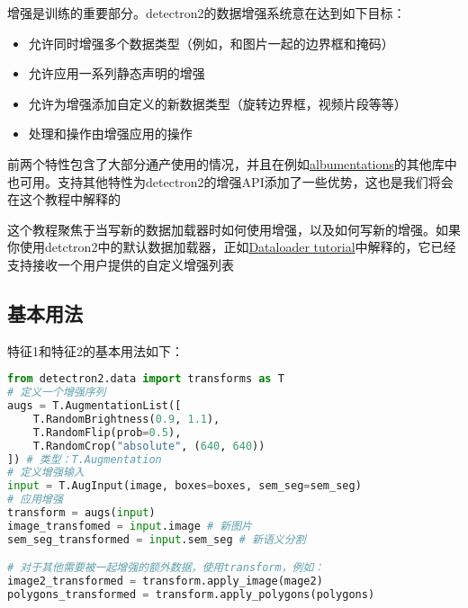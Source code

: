 \documentclass[../main]{subfile}
\begin{document}
增强是训练的重要部分。detectron2的数据增强系统意在达到如下目标：
\begin{itemize}
    \item 允许同时增强多个数据类型（例如，和图片一起的边界框和掩码）
    \item 允许应用一系列静态声明的增强
    \item 允许为增强添加自定义的新数据类型（旋转边界框，视频片段等等）
    \item 处理和操作由增强应用的操作
\end{itemize}
前两个特性包含了大部分通产使用的情况，并且在例如\href{https://medium.com/pytorch/multi-target-in-albumentations-16a777e9006e}{albumentations}的其他库中也可用。支持其他特性为detectron2的增强API添加了一些优势，这也是我们将会在这个教程中解释的

这个教程聚焦于当写新的数据加载器时如何使用增强，以及如何写新的增强。如果你使用detctron2中的默认数据加载器，正如\href{https://detectron2.readthedocs.io/en/latest/tutorials/data_loading.html}{Dataloader tutorial}中解释的，它已经支持接收一个用户提供的自定义增强列表

\subsection{基本用法}

特征1和特征2的基本用法如下：

\begin{lstlisting}[language=Python]
from detectron2.data import transforms as T
# 定义一个增强序列
augs = T.AugmentationList([
    T.RandomBrightness(0.9, 1.1),
    T.RandomFlip(prob=0.5),
    T.RandomCrop("absolute", (640, 640))
]) # 类型：T.Augmentation
# 定义增强输入
input = T.AugInput(image, boxes=boxes, sem_seg=sem_seg)
# 应用增强
transform = augs(input)
image_transfomed = input.image # 新图片
sem_seg_transformed = input.sem_seg # 新语义分割

# 对于其他需要被一起增强的额外数据，使用transform，例如：
image2_transformed = transform.apply_image(mage2)
polygons_transformed = transform.apply_polygons(polygons)
\end{lstlisting}
\end{document}
